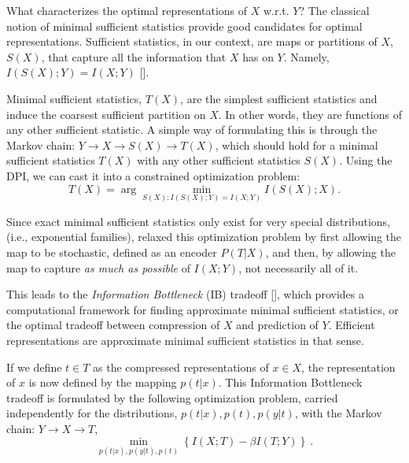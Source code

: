\documentclass[11pt]{article}
\begin{document}
What characterizes the optimal representations of $X$ w.r.t. $Y$? 
The classical notion of minimal sufficient statistics provide good candidates for optimal representations. Sufficient statistics, in our context, are maps or partitions of $X$, $S(X)$, that capture all the information that $X$ has on $Y$. Namely, $I(S(X);Y)=I(X;Y)$ [\citet{Cover:2006}]. 

Minimal sufficient statistics, $T(X)$, are the simplest sufficient statistics and induce the coarsest sufficient partition on $X$. In other words, they are functions of any other sufficient statistic. A simple way of formulating this is through the Markov chain: $Y\rightarrow X \rightarrow S(X) \rightarrow T(X)$, which should hold for a minimal sufficient statistics $T(X)$ with any other sufficient statistics $S(X)$. Using the DPI, we can cast it into a constrained optimization problem:
\begin{equation}
T(X) = \arg \min_{S(X): I(S(X);Y)=I(X;Y)} I(S(X);X) .
\end{equation}

Since exact minimal sufficient statistics only exist for very special distributions, (i.e., exponential families), \citet{DBLP:journals/corr/Tishby1999} relaxed this optimization problem by first allowing the map to be stochastic, defined as an encoder $P(T|X)$, and then, by allowing the map to capture \emph{as much as possible} of $I(X;Y)$, not necessarily all of it.

This leads to the \textit{Information Bottleneck} (IB) tradeoff [\citet{DBLP:journals/corr/Tishby1999}], which 
provides a computational framework for finding approximate minimal sufficient statistics, or the optimal tradeoff between compression of $X$ and prediction of $Y$.  Efficient representations are approximate minimal sufficient statistics in that sense.

If we define $t\in T$ as the compressed representations of $x\in X$, the
representation of $x$ is now defined by the mapping $p\left(t|x\right)$.
This Information Bottleneck tradeoff is formulated by the following optimization problem, carried independently for the distributions, $p(t|x), p(t), p(y|t)$, with the Markov chain: $Y\rightarrow X \rightarrow T$,
\begin{equation}
\min_{p\left(t|x\right),p\left(y|t\right),p\left(t\right)}\left\{ I\left(X;T\right)-\beta I\left(T;Y\right)\right\} ~.
\end{equation}
\end{document}
